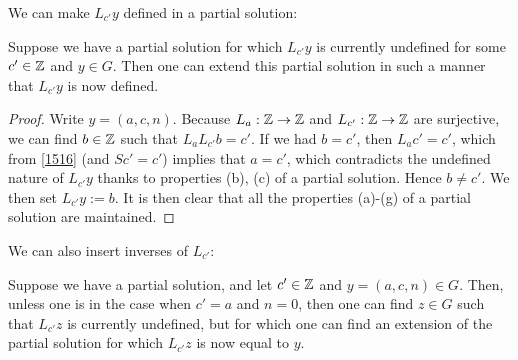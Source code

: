 We can make $L_{c'} y$ defined in a partial solution:

\begin{lemma}\label{first-ext}  Suppose we have a partial solution for which $L_{c'} y$ is currently undefined for some $c' \in \mathbb{Z}$ and $y \in G$.  Then one can extend this partial solution in such a manner that $L_{c'} y$ is now defined.
\end{lemma}

\begin{proof} Write $y = (a,c,n)$. Because $L_a: \mathbb{Z} \to \mathbb{Z}$ and $L_{c'}: \mathbb{Z} \to \mathbb{Z}$ are surjective, we can find $b \in \mathbb{Z}$ such that $L_a L_{c'} b = c'$.  If we had $b=c'$, then $L_a c' = c'$, which from \eqref{1516} (and $Sc' = c'$) implies that $a = c'$, which contradicts the undefined nature of $L_{c'} y$ thanks to properties (b), (c) of a partial solution.  Hence $b \neq c'$.
  We then set $L_{c'} y := b$.  It is then clear that all the properties (a)-(g) of a partial solution are maintained.
\end{proof}

We can also insert inverses of $L_{c'}$:

\begin{lemma}\label{second-ext}  Suppose we have a partial solution, and let $c' \in \mathbb{Z}$ and $y = (a,c,n) \in G$.  Then, unless one is in the case when $c'=a$ and $n=0$, then one can find $z \in G$ such that $L_{c'} z$ is currently undefined, but for which one can find an extension of the partial solution for which $L_{c'} z$ is now equal to $y$.
\end{lemma}

